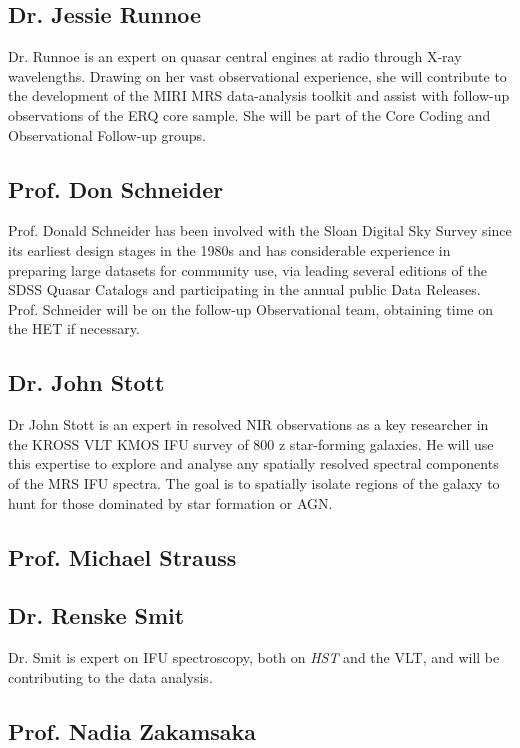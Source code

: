 \subsection*{Dr. Jessie Runnoe}
Dr. Runnoe is an expert on quasar central engines at radio through
X-ray wavelengths.  Drawing on her vast observational experience, she
will contribute to the development of the MIRI MRS data-analysis
toolkit and assist with follow-up observations of the ERQ core sample.
She will be part of the Core Coding and Observational Follow-up
groups.


\subsection*{Prof. Don Schneider}
Prof. Donald Schneider has been involved with the Sloan Digital Sky
Survey since its earliest design stages in the 1980s and has
considerable experience in preparing large datasets for community use,
via leading several editions of the SDSS Quasar Catalogs and
participating in the annual public Data Releases. Prof. Schneider will
be on the follow-up Observational team, obtaining time on the HET if
necessary.


\subsection*{Dr. John Stott}
Dr John Stott is an expert in resolved NIR observations as a key
researcher in the KROSS VLT KMOS IFU survey of 800 z
star-forming galaxies. He will use this expertise to explore and
analyse any spatially resolved spectral components of the MRS IFU
spectra. The goal is to spatially isolate regions of the galaxy to
hunt for those dominated by star formation or AGN.


\subsection*{Prof. Michael  Strauss}


\subsection*{Dr. Renske Smit}		
Dr. Smit is expert on IFU spectroscopy, both on {\it HST} and the VLT,
and will be contributing to the data analysis.

\subsection*{Prof. Nadia Zakamsaka} 


